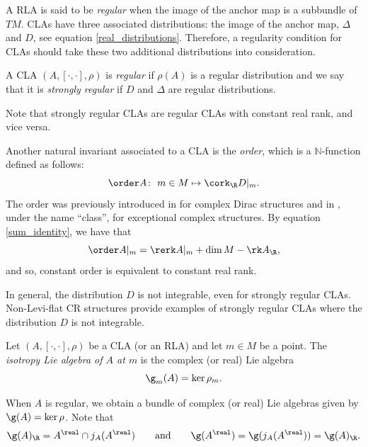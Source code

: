  A RLA is said to be {\em regular} when the image of the anchor map is a subbundle of $TM$. CLAs have three associated distributions: the image of the anchor map, $\Delta$ and $D$, see equation \eqref{real_distributions}. Therefore, a regularity condition for CLAs should take these two additional distributions into consideration.
 \begin{Definition}
 A CLA $(A,[\cdot,\cdot], \rho)$ is {\em regular} if $\rho(A)$ is a regular distribution and we say that it is {\em strongly regular} if $D$ and $\Delta$ are regular distributions.
\end{Definition}
 Note that strongly regular CLAs are regular CLAs with constant real rank, and vice versa.
\begin{Remark}
 Another natural invariant associated to a CLA is the {\em order}, which is a $\mathbb{N}$-function defined as follows:
 \[\order A\colon \ m\in M\mapsto \cork_{\R} D|_{m}.\]
The order was previously introduced in \cite{aguero2022complex} for complex Dirac structures and in \cite{tennyson2021exceptional}, under the name ``class'', for exceptional complex structures.
By equation \eqref{sum_identity}, we have that
\begin{equation}\label{orderrr}
\order A|_m=\rerk A|_m+\dim M-\rk A_{\R},
\end{equation}
and so, constant order is equivalent to constant real rank.
\end{Remark}

In general, the distribution $D$ is not integrable, even for strongly regular CLAs. Non-Levi-flat CR structures provide examples of strongly regular CLAs where the distribution $D$ is not integrable.
\begin{Definition}
Let $(A, [\cdot,\cdot], \rho)$ be a CLA (or an RLA) and let $m\in M$ be a point. The {\em isotropy Lie algebra of $A$ at $m$} is the complex (or real) Lie algebra
\[\g_m (A)=\ker\rho_m.\]
\end{Definition}
When $A$ is regular, we obtain a bundle of complex (or real) Lie algebras given by $\g(A)=\ker \rho$.
 Note that
 \begin{align*}
  \g(A)_{\R}= A^{\real}\cap j_A(A^{\real}) \qquad \text{and}\qquad
\g(A^{\real})=\g(j_A(A^{\real}))=\g(A)_{\R}.
   \end{align*}

